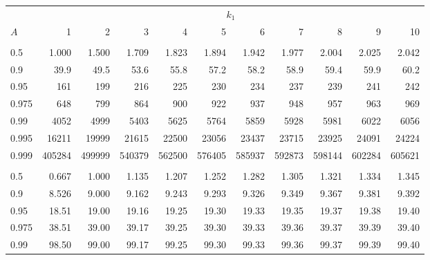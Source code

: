 \documentclass[
]{article}
\begin{document}
\begin{table}[H]
\centering
\begin{tabular}{lrrrrrrrrrr}
\toprule
\multicolumn{1}{c}{ } & \multicolumn{10}{c}{$k_1$} \\
\cmidrule(l{3pt}r{3pt}){2-11}
\hspace{1.1em}$A$ & 1 & 2 & 3 & 4 & 5 & 6 & 7 & 8 & 9 & 10\\
\midrule
\addlinespace[0.3em]
\multicolumn{11}{l}{\textbf{$k_2=1$}}\\
\hspace{1em}0.5 & 1.000 & 1.500 & 1.709 & 1.823 & 1.894 & 1.942 & 1.977 & 2.004 & 2.025 & 2.042\\
\hspace{1em}0.9 & 39.9 & 49.5 & 53.6 & 55.8 & 57.2 & 58.2 & 58.9 & 59.4 & 59.9 & 60.2\\
\hspace{1em}0.95 & 161 & 199 & 216 & 225 & 230 & 234 & 237 & 239 & 241 & 242\\
\hspace{1em}0.975 & 648 & 799 & 864 & 900 & 922 & 937 & 948 & 957 & 963 & 969\\
\hspace{1em}0.99 & 4052 & 4999 & 5403 & 5625 & 5764 & 5859 & 5928 & 5981 & 6022 & 6056\\
\hspace{1em}0.995 & 16211 & 19999 & 21615 & 22500 & 23056 & 23437 & 23715 & 23925 & 24091 & 24224\\
\hspace{1em}0.999 & 405284 & 499999 & 540379 & 562500 & 576405 & 585937 & 592873 & 598144 & 602284 & 605621\\
\addlinespace[0.3em]
\multicolumn{11}{l}{\textbf{$k_2=2$}}\\
\hspace{1em}0.5 & 0.667 & 1.000 & 1.135 & 1.207 & 1.252 & 1.282 & 1.305 & 1.321 & 1.334 & 1.345\\
\hspace{1em}0.9 & 8.526 & 9.000 & 9.162 & 9.243 & 9.293 & 9.326 & 9.349 & 9.367 & 9.381 & 9.392\\
\hspace{1em}0.95 & 18.51 & 19.00 & 19.16 & 19.25 & 19.30 & 19.33 & 19.35 & 19.37 & 19.38 & 19.40\\
\hspace{1em}0.975 & 38.51 & 39.00 & 39.17 & 39.25 & 39.30 & 39.33 & 39.36 & 39.37 & 39.39 & 39.40\\
\hspace{1em}0.99 & 98.50 & 99.00 & 99.17 & 99.25 & 99.30 & 99.33 & 99.36 & 99.37 & 99.39 & 99.40\\

\end{tabular}
\end{table}
\end{document}
